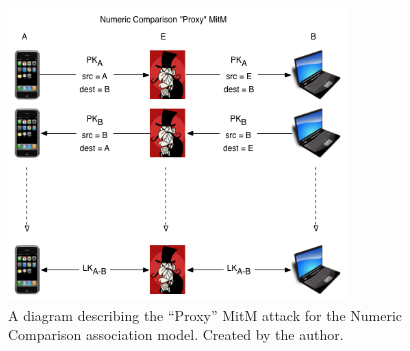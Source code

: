 \documentclass{acm_proc_article-sp}
\begin{document}
\begin{figure}
    \begin{center}
        \includegraphics[width=0.8\textwidth]{diagrams/nc_proxy_mitm.png}
        \caption{A diagram describing the ``Proxy'' MitM attack for the Numeric Comparison association model. Created by the author.}
        \label{nc_proxy_mitm}
    \end{center}
\end{figure}

\balancecolumns
\end{document}

